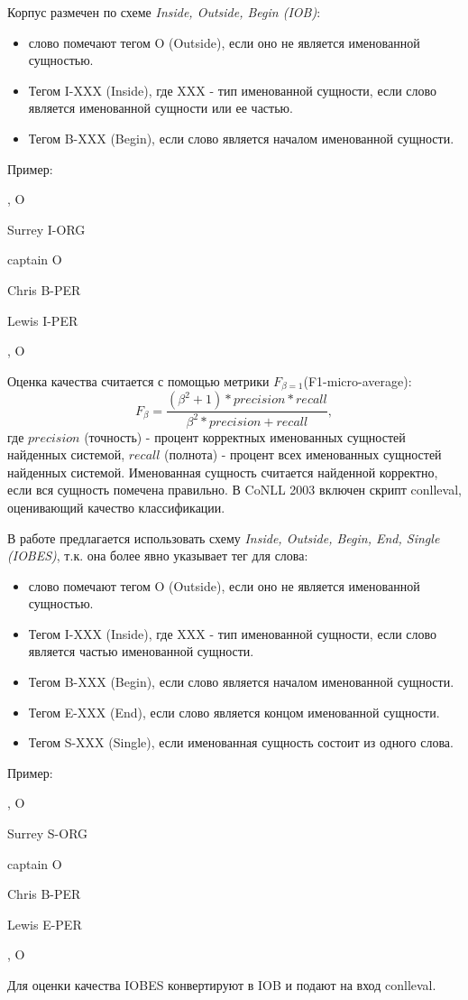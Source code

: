   Корпус размечен по схеме \textit{Inside, Outside, Begin (IOB)}:
  \begin{itemize}
  \item слово помечают тегом O (Outside), если оно не является именованной сущностью.
  \item Тегом I-XXX (Inside), где XXX - тип именованной сущности, если слово
    является именованной сущности или ее частью.
  \item Тегом B-XXX (Begin), если слово является началом именованной сущности.
  \end{itemize}

  Пример:
  \centerline{}
  \centerline{, O}
  \centerline{Surrey I-ORG}
  \centerline{captain O}
  \centerline{Chris B-PER}
  \centerline{Lewis I-PER}
  \centerline{, O}

  Оценка качества считается с помощью метрики $F_{\beta=1}$(F1-micro-average):
  \[
    F_\beta = \frac{(\beta^2 + 1) * precision * recall}{\beta^2*precision + recall},
  \]
  где $precision$ (точность) - процент корректных именованных сущностей
  найденных системой, $recall$ (полнота) - процент всех именованных сущностей
  найденных системой. Именованная сущность считается найденной корректно, если
  вся сущность помечена правильно.
  В CoNLL 2003 включен скрипт conlleval, оценивающий качество классификации.

  В работе \citep{collobert2011natural} предлагается использовать схему
  \textit{Inside, Outside, Begin, End, Single (IOBES)}, т.к. она более явно указывает
  тег для слова:
  \begin{itemize}
  \item слово помечают тегом O (Outside), если оно не является именованной сущностью.
  \item Тегом I-XXX (Inside), где XXX - тип именованной сущности, если слово является частью именованной сущности.
  \item Тегом B-XXX (Begin), если слово является началом именованной сущности.
  \item Тегом E-XXX (End), если слово является концом именованной сущности.
  \item Тегом S-XXX (Single), если именованная сущность состоит из одного слова.
  \end{itemize}

  Пример:
  \centerline{}
  \centerline{, O}
  \centerline{Surrey S-ORG}
  \centerline{captain O}
  \centerline{Chris B-PER}
  \centerline{Lewis E-PER}
  \centerline{, O}

  Для оценки качества IOBES конвертируют в IOB и подают на вход conlleval.

